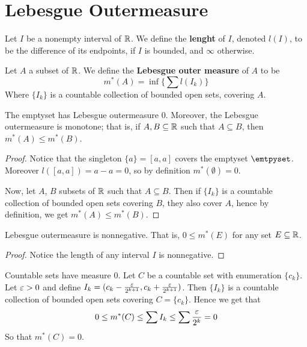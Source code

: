 \section{Lebesgue Outermeasure}

\begin{definition}
    Let $I$ be a nonempty interval of  $\mathbb{R}$. We define the  \textbf{lenght} of
    $I$, denoted  $l(I)$, to be the difference of its endpoints, if $I$ is
    bounded, and  $\infty$ otherwise.
\end{definition}

\begin{definition}
    Let $A$ a subset of  $\mathbb{R}$. We define the  \textbf{Lebesgue outer measure} of
    $A$ to be
    \begin{equation*}
        m^\ast(A)=\inf{\{\sum{l(I_k)}\}}
    \end{equation*}
    Where $\{I_k\}$ is a countable collection of bounded open sets, covering
    $A$.
\end{definition}

\begin{lemma}\label{2.1.1}
    The emptyset has Lebesgue outermeasure $0$. Moreover, the Lebesgue
    outermeasure is monotone; that is, if $A,B \subseteq \mathbb{R}$ such that  $A
    \subseteq B$, then  $m^\ast(A) \leq m^\ast(B)$.
\end{lemma}
\begin{proof}
    Notice that the singleton $\{a\}=[a,a]$ covers the emptyset $\emtpyset$.
    Moreover  $l([a,a])=a-a=0$, so by definition $m^\ast(\emptyset)=0$.

    Now, let $A$,  $B$ subsets of  $\mathbb{R}$ such that  $A \subseteq B$. Then if
    $\{I_k\}$ is a countable collection of bounded open sets covering $B$, they
    also cover  $A$, hence by definition, we get  $m^\ast(A) \leq m^\ast(B)$.
\end{proof}
\begin{corollary}
    Lebesgue outermeasure is nonnegative. That is, $0 \leq m^\ast(E)$ for any
    set $E \subseteq \mathbb{R}$.
\end{corollary}
\begin{proof}
    Notice the length of any interval $I$ is nonnegative.
\end{proof}

\begin{example}\label{example_2.1}
    Countable sets have measure $0$. Let  $C$ be a countable set with
    enumeration  $\{c_k\}$. Let $\varepsilon>0$ and define  $I_k=(c_k-\frac{\varepsilon}{2^{k+1}},
    c_k+\frac{\varepsilon}{2^{k+1}})$. Then $\{I_k\}$ is a countable collection of
    bounded open sets covering $C=\{c_k\}$. Hence we get that
    \begin{equation*}
        0 \leq m^\ast(C) \leq \sum{I_k} \leq \sum{\frac{\varepsilon}{2^k}}=0
    \end{equation*}
    So that $m^\ast(C)=0$.
\end{example}

